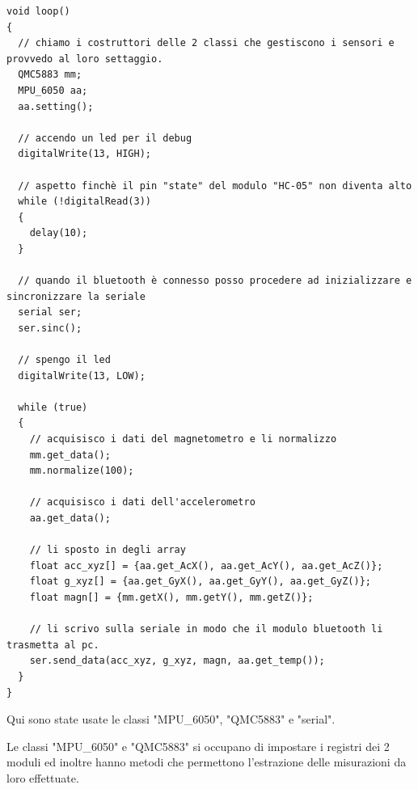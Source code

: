 \documentclass[10pt,a4paper]{article}
\begin{document}
\begin{lstlisting}[style=myArduino, caption=funzione "loop", captionpos=b]
void loop() 
{
  // chiamo i costruttori delle 2 classi che gestiscono i sensori e provvedo al loro settaggio.
  QMC5883 mm;
  MPU_6050 aa;
  aa.setting();

  // accendo un led per il debug  
  digitalWrite(13, HIGH);
  
  // aspetto finchè il pin "state" del modulo "HC-05" non diventa alto
  while (!digitalRead(3))
  {
    delay(10);
  }
  
  // quando il bluetooth è connesso posso procedere ad inizializzare e sincronizzare la seriale
  serial ser; 
  ser.sinc(); 

  // spengo il led
  digitalWrite(13, LOW);
  
  while (true)
  {
    // acquisisco i dati del magnetometro e li normalizzo
    mm.get_data();
    mm.normalize(100);
    
    // acquisisco i dati dell'accelerometro
    aa.get_data();

    // li sposto in degli array
    float acc_xyz[] = {aa.get_AcX(), aa.get_AcY(), aa.get_AcZ()};
    float g_xyz[] = {aa.get_GyX(), aa.get_GyY(), aa.get_GyZ()};
    float magn[] = {mm.getX(), mm.getY(), mm.getZ()};

    // li scrivo sulla seriale in modo che il modulo bluetooth li trasmetta al pc.
    ser.send_data(acc_xyz, g_xyz, magn, aa.get_temp());
  }
}
\end{lstlisting}
Qui sono state usate le classi "MPU\_6050", "QMC5883" e "serial".



Le classi "MPU\_6050" e "QMC5883" si occupano di impostare i registri dei 2 moduli ed inoltre hanno metodi che permettono l'estrazione delle misurazioni da loro effettuate. 
\end{document}
